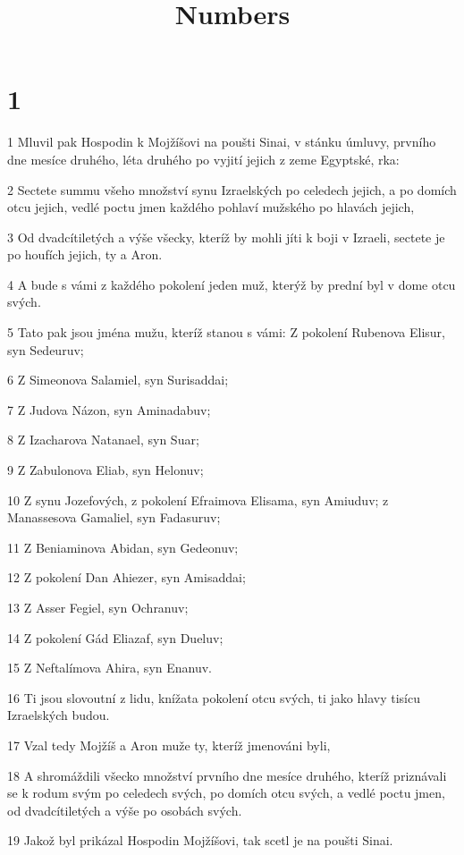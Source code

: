 

\title{Numbers}

\chapter{1}

\par 1 Mluvil pak Hospodin k Mojžíšovi na poušti Sinai, v stánku úmluvy, prvního dne mesíce druhého, léta druhého po vyjití jejich z zeme Egyptské, rka:
\par 2 Sectete summu všeho množství synu Izraelských po celedech jejich, a po domích otcu jejich, vedlé poctu jmen každého pohlaví mužského po hlavách jejich,
\par 3 Od dvadcítiletých a výše všecky, kteríž by mohli jíti k boji v Izraeli, sectete je po houfích jejich, ty a Aron.
\par 4 A bude s vámi z každého pokolení jeden muž, kterýž by prední byl v dome otcu svých.
\par 5 Tato pak jsou jména mužu, kteríž stanou s vámi: Z pokolení Rubenova Elisur, syn Sedeuruv;
\par 6 Z Simeonova Salamiel, syn Surisaddai;
\par 7 Z Judova Názon, syn Aminadabuv;
\par 8 Z Izacharova Natanael, syn Suar;
\par 9 Z Zabulonova Eliab, syn Helonuv;
\par 10 Z synu Jozefových, z pokolení Efraimova Elisama, syn Amiuduv; z Manassesova Gamaliel, syn Fadasuruv;
\par 11 Z Beniaminova Abidan, syn Gedeonuv;
\par 12 Z pokolení Dan Ahiezer, syn Amisaddai;
\par 13 Z Asser Fegiel, syn Ochranuv;
\par 14 Z pokolení Gád Eliazaf, syn Dueluv;
\par 15 Z Neftalímova Ahira, syn Enanuv.
\par 16 Ti jsou slovoutní z lidu, knížata pokolení otcu svých, ti jako hlavy tisícu Izraelských budou.
\par 17 Vzal tedy Mojžíš a Aron muže ty, kteríž jmenováni byli,
\par 18 A shromáždili všecko množství prvního dne mesíce druhého, kteríž priznávali se k rodum svým po celedech svých, po domích otcu svých, a vedlé poctu jmen, od dvadcítiletých a výše po osobách svých.
\par 19 Jakož byl prikázal Hospodin Mojžíšovi, tak scetl je na poušti Sinai.
